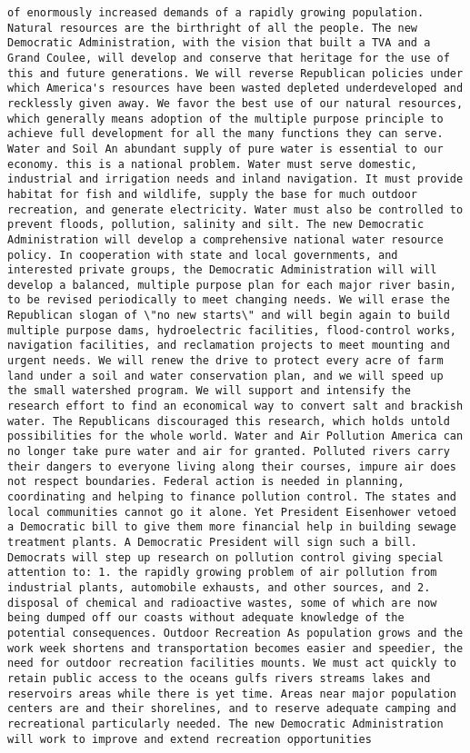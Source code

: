 \documentclass[
]{article}
\begin{document}
\begin{verbatim}
of enormously increased demands of a rapidly growing population. Natural resources are the birthright of all the people. The new Democratic Administration, with the vision that built a TVA and a Grand Coulee, will develop and conserve that heritage for the use of this and future generations. We will reverse Republican policies under which America's resources have been wasted depleted underdeveloped and recklessly given away. We favor the best use of our natural resources, which generally means adoption of the multiple purpose principle to achieve full development for all the many functions they can serve. Water and Soil An abundant supply of pure water is essential to our economy. this is a national problem. Water must serve domestic, industrial and irrigation needs and inland navigation. It must provide habitat for fish and wildlife, supply the base for much outdoor recreation, and generate electricity. Water must also be controlled to prevent floods, pollution, salinity and silt. The new Democratic Administration will develop a comprehensive national water resource policy. In cooperation with state and local governments, and interested private groups, the Democratic Administration will will develop a balanced, multiple purpose plan for each major river basin, to be revised periodically to meet changing needs. We will erase the Republican slogan of \"no new starts\" and will begin again to build multiple purpose dams, hydroelectric facilities, flood-control works, navigation facilities, and reclamation projects to meet mounting and urgent needs. We will renew the drive to protect every acre of farm land under a soil and water conservation plan, and we will speed up the small watershed program. We will support and intensify the research effort to find an economical way to convert salt and brackish water. The Republicans discouraged this research, which holds untold possibilities for the whole world. Water and Air Pollution America can no longer take pure water and air for granted. Polluted rivers carry their dangers to everyone living along their courses, impure air does not respect boundaries. Federal action is needed in planning, coordinating and helping to finance pollution control. The states and local communities cannot go it alone. Yet President Eisenhower vetoed a Democratic bill to give them more financial help in building sewage treatment plants. A Democratic President will sign such a bill. Democrats will step up research on pollution control giving special attention to: 1. the rapidly growing problem of air pollution from industrial plants, automobile exhausts, and other sources, and 2. disposal of chemical and radioactive wastes, some of which are now being dumped off our coasts without adequate knowledge of the potential consequences. Outdoor Recreation As population grows and the work week shortens and transportation becomes easier and speedier, the need for outdoor recreation facilities mounts. We must act quickly to retain public access to the oceans gulfs rivers streams lakes and reservoirs areas while there is yet time. Areas near major population centers are and their shorelines, and to reserve adequate camping and recreational particularly needed. The new Democratic Administration will work to improve and extend recreation opportunities 
\end{verbatim}
\end{document}

